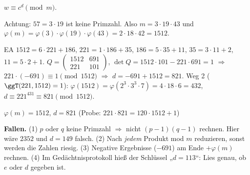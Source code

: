  $w \equiv c^d \pmod m$.

 Achtung: $57 = 3 \cdot 19$ ist keine Primzahl. Also $m = 3 \cdot 19 \cdot 43$ und $\varphi(m) = \varphi(3) \cdot \varphi(19) \cdot \varphi(43) = 2 \cdot 18 \cdot 42 = 1512$.

 EA $1512 = 6 \cdot 221 + 186$, $221 = 1 \cdot 186 + 35$, $186 = 5 \cdot 35 + 11$, $35 = 3 \cdot 11 + 2$, $11 = 5 \cdot 2 + 1$.
$Q = \begin{pmatrix}1512 & 691\\ 221 & 101\end{pmatrix}$, $\det Q = 1512 \cdot 101 - 221 \cdot 691 = 1$ $\Rightarrow$ $221 \cdot (-691) \equiv 1 \pmod{1512}$ $\Rightarrow$ $d = -691 + 1512 = 821$.
Weg 2 ($\ggT(221, 1512) = 1$): $\varphi(1512) = \varphi(2^3 \cdot 3^3 \cdot 7) = 4 \cdot 18 \cdot 6 = 432$, $d \equiv 221^{431} \equiv 821 \pmod{1512}$.
\begin{ergebnis} $\varphi(m) = 1512$, $d = 821$ (Probe: $221 \cdot 821 = 120 \cdot 1512 + 1$) \end{ergebnis}

\begin{achtung}
\textbf{Fallen.} (1) $p$ oder $q$ keine Primzahl $\Rightarrow$ nicht $(p-1)(q-1)$ rechnen. Hier wäre $2352$ und $d = 149$ falsch.
(2) Nach \emph{jedem} Produkt mod $m$ reduzieren, sonst werden die Zahlen riesig.
(3) Negative Ergebnisse ($-691$) am Ende $+\varphi(m)$ rechnen.
(4) Im Gedächtnisprotokoll hieß der Schlüssel „$d = 113$“: Lies genau, ob $e$ oder $d$ gegeben ist.
\end{achtung}
